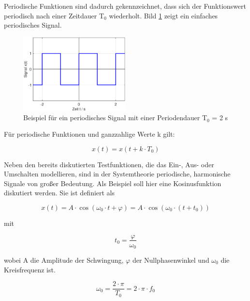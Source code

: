Periodische Funktionen sind dadurch gekennzeichnet, dass sich der Funktionswert periodisch nach einer Zeitdauer T${}_{0}$ wiederholt. Bild \ref{fig:Periodisch} zeigt ein einfaches periodisches Signal.

\begin{figure}[ht]
  \centerline{\includegraphics[width=0.5\textwidth]{Kapitel1/Bilder/image21}}
  \caption{Beispiel f\"{u}r ein periodisches Signal mit einer Periodendauer T${}_{0}$ = 2 s }
  \label{fig:Periodisch}
\end{figure}

\noindent F\"{u}r periodische Funktionen und ganzzahlige Werte k gilt:

\begin{equation}\label{eq:onesixtyfive}
x\left(t\right)=x\left(t+k\cdot T_{0} \right)
\end{equation}

\noindent Neben den bereits diskutierten Testfunktionen, die das Ein-, Aus- oder Umschalten modellieren, sind in der Systemtheorie periodische, harmonische Signale von gro{\ss}er Bedeutung. Als Beispiel soll hier eine Kosinusfunktion diskutiert werden. Sie ist definiert als

\begin{equation}\label{eq:onesixtysix}
x\left(t\right)=A\cdot \cos \left(\omega _{0} \cdot t+\varphi \right)=A\cdot \cos \left(\omega _{0} \cdot \left(t+t_{0} \right)\right)
\end{equation}

\noindent mit

\begin{equation}\label{eq:onesixtyseven}
t_{0} =\dfrac{\varphi }{\omega _{0} } 
\end{equation}

\noindent wobei A die Amplitude der Schwingung, $\varphi$ der Nullphasenwinkel und $\omega{}_{0}$ die Kreisfrequenz ist.

\begin{equation}\label{eq:onesixtyeight}
\omega _{0} =\dfrac{2\cdot \pi }{T_{0} } =2\cdot \pi \cdot f_{0} 
\end{equation}

